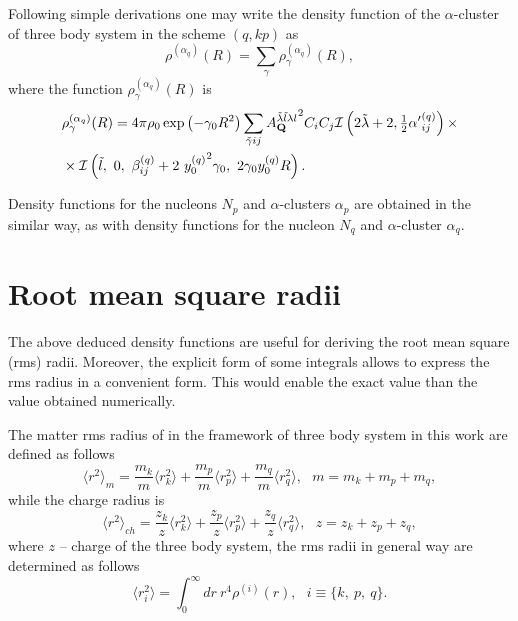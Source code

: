 \documentclass[
12pt, %
oneside, %
english, %
doublespacing, %
doublespacing, %
toctotoc, %
parskip, %
headsepline, %
]{MastersDoctoralThesis} %
\begin{document}
Following simple derivations one may write the density function of the $\alpha$-cluster of three body system in the scheme ${(q,kp)}$  as
\begin{equation}
\rho^{(\alpha_q)}(R)=\sum_{\gamma}\rho^{(\alpha_q)}_{\gamma}(R),
\label{rho_alpha_q}
\end{equation}
where the function $\rho^{(\alpha_q)}_{\gamma}(R)$ is
\begin{align}
&\rho_\gamma^{(\alpha_q)}(R)=
4 \pi \rho_0 \exp\left(-\gamma_0 R^2 \right)
\sum_{\tilde{\gamma}ij} 
{A^{\tilde{\lambda} \tilde{l} \lambda l}_{{\bf Q} }}^2
  C_i C_j 
 \mathcal{I}\left( 2\tilde{\lambda}+2, \tfrac{1}{2} {\alpha'}^{(q)}_{ij}\right) \times \\
 & \times \mathcal{I}\left( \tilde{l},~0,~\beta_{ij}^{(q)}+2~{y^{(q)}_0}^2 \gamma_0, ~2 \gamma_0 y^{(q)}_0 R \right).
 \nonumber
\end{align}

Density functions for the nucleons $N_p$ and $\alpha$-clusters $\alpha_p$ are obtained in the similar way, as with density functions for the nucleon $N_q$ and $\alpha$-cluster $\alpha_q$.



\section{Root mean square radii}
The above deduced density functions are useful for deriving the root mean square (rms) radii. Moreover, the explicit form of some integrals allows to express the rms radius in a convenient form. This would enable the exact value than the value obtained numerically.

The matter rms radius of in the framework of three body system in this work are defined as follows
\begin{equation}
\langle r^2 \rangle_m = 
\frac{m_k}{m} \langle r^2_k \rangle 
+ \frac{m_p}{m} \langle r^2_p \rangle 
+\frac{m_q}{m} \langle r^2_q \rangle, ~~~m=m_k+m_p+m_q,
\end{equation}
while the charge radius is
\begin{equation}
\langle r^2 \rangle_{ch} = 
\frac{z_k}{z} \langle r^2_k \rangle 
+ \frac{z_p}{z} \langle r^2_p \rangle 
+\frac{z_q}{z} \langle r^2_q \rangle,~~~z=z_k+z_p+z_q,
\end{equation}
where $z$ -- charge of the three body system, the rms radii in general way are determined as follows
\begin{equation}
\langle r^2_i \rangle = 
\int_0^{\infty} dr~ r^{4} \rho^{(i)}(r),~~~i\equiv\{k,~p,~q\}.
\label{rms_general}
\end{equation}
\end{document}
